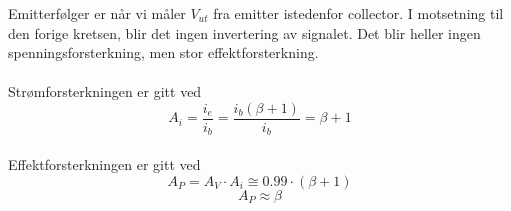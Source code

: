 Emitterfølger er når vi måler $V_{ut}$ fra emitter istedenfor collector.
I motsetning til den forige kretsen, blir det ingen invertering av signalet.
Det blir heller ingen spenningsforsterkning, men stor effektforsterkning.
\\\\
Strømforsterkningen er gitt ved
$$A_i = \frac{i_e}{i_b}
= \frac{i_b(\beta +1)}{i_b} = \beta + 1$$
\\
Effektforsterkningen er gitt ved
$$A_P = A_V \cdot A_i
\cong 0.99 \cdot (\beta + 1)$$
$$A_P \approx \beta$$
